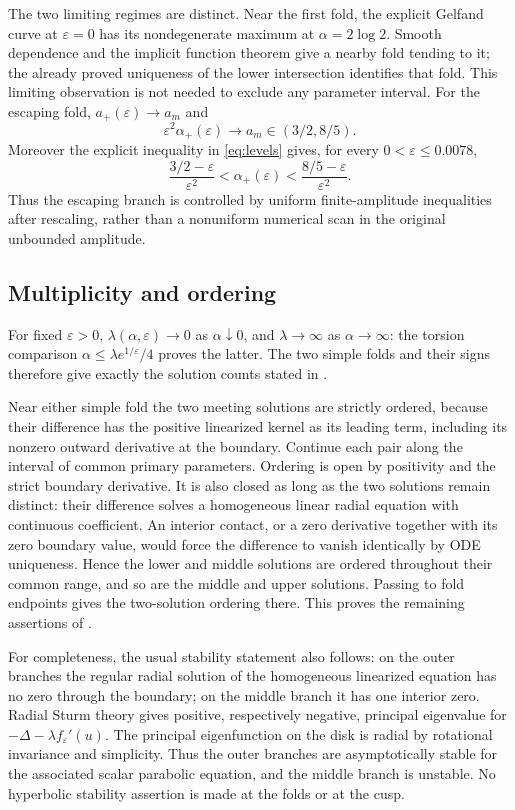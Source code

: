 \documentclass[11pt,a4paper]{report}
\begin{document}
The two limiting regimes are distinct. Near the first fold, the explicit
Gelfand curve at $\varepsilon=0$ has its nondegenerate maximum at
$\alpha=2\log2$. Smooth dependence and the implicit function theorem give
a nearby fold tending to it; the already proved uniqueness of the lower
intersection identifies that fold. This limiting observation is not needed
to exclude any parameter interval. For the escaping fold,
$a_+(\varepsilon)\to a_m$ and
\[
 \varepsilon^2\alpha_+(\varepsilon)\to a_m\in(3/2,8/5).
\]
Moreover the explicit inequality in \eqref{eq:levels} gives, for every
$0<\varepsilon\leq0.0078$,
\[
 \frac{3/2-\varepsilon}{\varepsilon^2}
 <\alpha_+(\varepsilon)<
 \frac{8/5-\varepsilon}{\varepsilon^2}.
\]
Thus the escaping branch is controlled by uniform finite-amplitude
inequalities after rescaling, rather than a nonuniform numerical scan in
the original unbounded amplitude.

\subsection{Multiplicity and ordering}
For fixed $\varepsilon>0$, $\lambda(\alpha,\varepsilon)\to0$ as
$\alpha\downarrow0$, and $\lambda\to\infty$ as $\alpha\to\infty$:
the torsion comparison $\alpha\leq\lambda e^{1/\varepsilon}/4$ proves
the latter. The two simple folds and their signs therefore give exactly
the solution counts stated in .

Near either simple fold the two meeting solutions are strictly ordered,
because their difference has the positive linearized kernel as its leading
term, including its nonzero outward derivative at the boundary. Continue
each pair along the interval of common primary parameters. Ordering is open
by positivity and the strict boundary derivative. It is also closed as long
as the two solutions remain distinct: their difference solves a homogeneous
linear radial equation with continuous coefficient. An interior contact,
or a zero derivative together with its zero boundary value, would force the
difference to vanish identically by ODE uniqueness. Hence the lower and
middle solutions are ordered throughout their common range, and so are the
middle and upper solutions. Passing to fold endpoints gives the two-solution
ordering there. This proves the remaining assertions of .

For completeness, the usual stability statement also follows: on the outer
branches the regular radial solution of the homogeneous linearized equation
has no zero through the boundary; on the middle branch it has one interior
zero. Radial Sturm theory gives positive, respectively negative, principal
eigenvalue for $-\Delta-\lambda f_\varepsilon'(u)$. The principal eigenfunction
on the disk is radial by rotational invariance and simplicity. Thus the
outer branches are asymptotically stable for the associated scalar parabolic
equation, and the middle branch is unstable. No hyperbolic stability assertion
is made at the folds or at the cusp.
\end{document}
